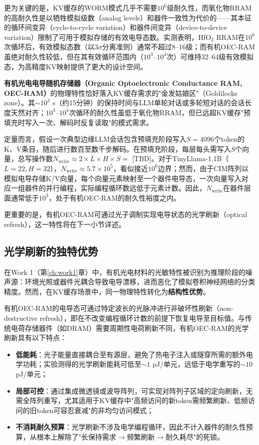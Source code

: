 更为关键的是，KV缓存的WORM模式几乎不需要$10^6$级耐久性，而氧化物RRAM的高耐久性是以牺牲模拟级数（analog levels）和器件一致性为代价的——其本征的循环间变异（cycle-to-cycle variation）和器件间变异（device-to-device variation）限制了可用于模拟存储的有效电导态数。实测表明，HfO$_2$ RRAM在$10^6$次循环后，有效模拟态数（以$3\sigma$分离准则）通常不超过8–16级；而有机OEC-RAM虽绝对耐久性较低，但在其有效循环范围内（$10^3$–$10^4$次）可维持32–64级有效模拟态，为高精度KV映射提供了更大的设计空间。

\textbf{有机光电电导随机存储器（Organic Optoelectronic Conductance RAM, OEC-RAM）}的物理特性恰好落入KV缓存需求的"金发姑娘区"（Goldilocks zone）。其$\sim$$10^3$ s（约15分钟）的保持时间与LLM单轮对话或多轮短对话的会话长度天然对齐；$10^3$–$10^4$次循环的耐久性虽低于氧化物RRAM，但已远超KV缓存"预填充时写入一次、解码时反复读取"的模式需求。

定量而言，假设一次典型边缘LLM会话包含预填充阶段写入$S=4096$个token的K、V条目，随后进行数百至数千步解码。在预填充阶段，每层每头需写入$S$个向量，总写操作数$N_{\text{write}} \approx 2 \times L \times H \times S = $ [TBD]。对于TinyLlama-1.1B（$L=22, H=32$），$N_{\text{write}} \approx 5.7 \times 10^5$，看似接近$10^6$边界；然而，由于CIM阵列以模拟电导存储K/V向量，每个向量元素映射至一个器件电导态，一次向量写入对应一组器件的并行编程，实际编程循环数远低于元素计数。因此，$N_{\text{write}}$在器件层面通常低于$10^3$，处于有机OEC-RAM的耐久性裕度之内。

更重要的是，有机OEC-RAM可通过光子调制实现电导状态的光学刷新（optical refresh），这一特性将在下一小节详述。

\subsection{光学刷新的独特优势}

在Work 1（第\ref{ch:work1}章）中，有机光电材料的光敏特性被识别为推理阶段的噪声源：环境光照或器件光耦合导致电导漂移，进而恶化了模拟卷积神经网络的分类精度。然而，在KV缓存场景中，同一物理特性转化为\textbf{结构性优势}。

有机OEC-RAM的电导态可通过特定波长的光脉冲进行非破坏性刷新（non-destructive refresh），即在不改变编程循环计数的前提下恢复电导至目标值。与传统电荷存储器件（如DRAM）需要周期性电荷刷新不同，有机OEC-RAM的光学刷新具有以下特点：

\begin{itemize}
    \item \textbf{低能耗}：光子能量直接耦合至有源层，避免了热电子注入或隧穿所需的额外电学功耗；实验测得的光学刷新能耗可低至$\sim$$1$ pJ/单元，远低于电学重写的$\sim$$10$ pJ/单元；
    \item \textbf{局部可控}：通过集成微透镜或波导阵列，可实现对阵列子区域的定向刷新，无需全阵列重写，尤其适用于KV缓存中"高频访问的新token需频繁刷新、低频访问的旧token可容忍衰减"的非均匀访问模式；
    \item \textbf{不消耗耐久预算}：光学刷新不涉及电学编程循环，因此不计入器件的耐久性预算，从根本上解除了"长保持需求$\rightarrow$频繁刷新$\rightarrow$耐久耗尽"的死锁。
\end{itemize}

